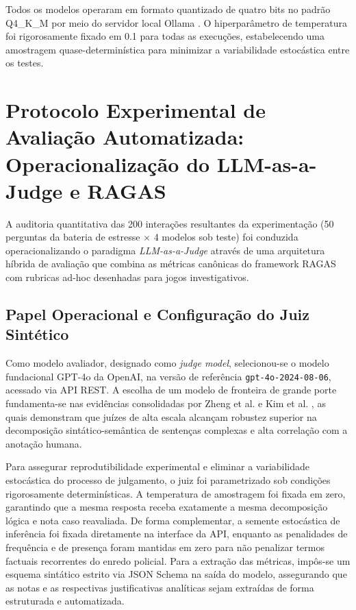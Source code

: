 Todos os modelos operaram em formato quantizado de quatro bits no padrão Q4\_K\_M por meio do servidor local Ollama \cite{gerganov2023llamacpp,ollama2023runtime}. O hiperparâmetro de temperatura foi rigorosamente fixado em 0.1 para todas as execuções, estabelecendo uma amostragem quase-determinística para minimizar a variabilidade estocástica entre os testes.

\section[Protocolo Experimental de Avaliação Automatizada]{Protocolo Experimental de Avaliação Automatizada: Operacionalização do LLM-as-a-Judge e RAGAS}
\label{sec:met_protocolo_ragas}

A auditoria quantitativa das 200 interações resultantes da experimentação (50 perguntas da bateria de estresse $\times$ 4 modelos sob teste) foi conduzida operacionalizando o paradigma \textit{LLM-as-a-Judge} através de uma arquitetura híbrida de avaliação que combina as métricas canônicas do framework RAGAS \cite{es2024ragas} com rubricas ad-hoc desenhadas para jogos investigativos.

\subsection{Papel Operacional e Configuração do Juiz Sintético}
\label{subsec:met_juiz_config}

Como modelo avaliador, designado como \textit{judge model}, selecionou-se o modelo fundacional GPT-4o da OpenAI, na versão de referência \texttt{gpt-4o-2024-08-06}, acessado via API REST. A escolha de um modelo de fronteira de grande porte fundamenta-se nas evidências consolidadas por Zheng et al. \cite{zheng2023judging} e Kim et al. \cite{kim2024prometheus}, as quais demonstram que juízes de alta escala alcançam robustez superior na decomposição sintático-semântica de sentenças complexas e alta correlação com a anotação humana.

Para assegurar reprodutibilidade experimental e eliminar a variabilidade estocástica do processo de julgamento, o juiz foi parametrizado sob condições rigorosamente determinísticas. A temperatura de amostragem foi fixada em zero, garantindo que a mesma resposta receba exatamente a mesma decomposição lógica e nota caso reavaliada. De forma complementar, a semente estocástica de inferência foi fixada diretamente na interface da API, enquanto as penalidades de frequência e de presença foram mantidas em zero para não penalizar termos factuais recorrentes do enredo policial. Para a extração das métricas, impôs-se um esquema sintático estrito via JSON Schema na saída do modelo, assegurando que as notas e as respectivas justificativas analíticas sejam extraídas de forma estruturada e automatizada.

